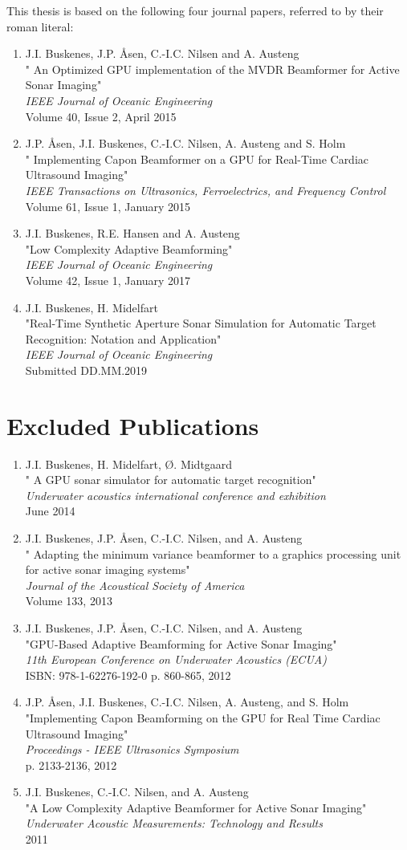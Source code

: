 This thesis is based on the following four journal papers, referred to by their roman literal:

\newcommand\pubEntry[4]{\item #2\\"#1"\\\textit{#3}\\#4}
{\renewcommand{\theenumi}{\textbf{\Roman{enumi}}}
\renewcommand\cleardoublepage{\newpage}
\begin{enumerate}
\pubEntry{%
An Optimized GPU implementation of the MVDR Beamformer for Active Sonar Imaging}%
{J.I. Buskenes, J.P. Åsen, C.-I.C. Nilsen and A. Austeng}%
{IEEE Journal of Oceanic Engineering}%
{Volume 40, Issue 2, April 2015}
%
\pubEntry{%
Implementing Capon Beamformer on a GPU for Real-Time Cardiac Ultrasound Imaging}%
{J.P. Åsen, J.I. Buskenes, C.-I.C. Nilsen, A. Austeng and S. Holm}%
{IEEE Transactions on Ultrasonics, Ferroelectrics, and Frequency Control}%
{Volume 61, Issue 1, January 2015}
%
\pubEntry%
{Low Complexity Adaptive Beamforming}%
{J.I. Buskenes, R.E. Hansen and A. Austeng}%
{IEEE Journal of Oceanic Engineering}%
{Volume 42, Issue 1, January 2017}
%
\pubEntry%
{Real-Time Synthetic Aperture Sonar Simulation for Automatic Target Recognition: Notation and Application}%
{J.I. Buskenes, H. Midelfart}%
{IEEE Journal of Oceanic Engineering}%
{Submitted DD.MM.2019}
\end{enumerate}


\chapter*{Excluded Publications}

\begin{enumerate}
\pubEntry{%
A GPU sonar simulator for automatic target recognition}%
{J.I. Buskenes, H. Midelfart, Ø. Midtgaard}%
{Underwater acoustics international conference and exhibition}%
{June 2014}
%
\pubEntry{%
Adapting the minimum variance beamformer to a graphics processing unit for active sonar imaging systems}%
{J.I. Buskenes, J.P. Åsen, C.-I.C. Nilsen, and A. Austeng}%
{Journal of the Acoustical Society of America}%
{Volume 133, 2013}
%
\pubEntry%
{GPU-Based Adaptive Beamforming for Active Sonar Imaging}%
{J.I. Buskenes, J.P. Åsen, C.-I.C. Nilsen, and A. Austeng}%
{11th European Conference on Underwater Acoustics (ECUA)}%
{ISBN: 978-1-62276-192-0 p. 860-865, 2012}
%
\pubEntry%
{Implementing Capon Beamforming on the GPU for Real Time Cardiac Ultrasound Imaging}%
{J.P. Åsen, J.I. Buskenes, C.-I.C. Nilsen, A. Austeng, and S. Holm}%
{Proceedings - IEEE Ultrasonics Symposium}%
{p. 2133-2136, 2012}
%
\pubEntry%
{A Low Complexity Adaptive Beamformer for Active Sonar Imaging}%
{J.I. Buskenes, C.-I.C. Nilsen, and A. Austeng}%
{Underwater Acoustic Measurements: Technology and Results}%
{2011}
\end{enumerate}
}



